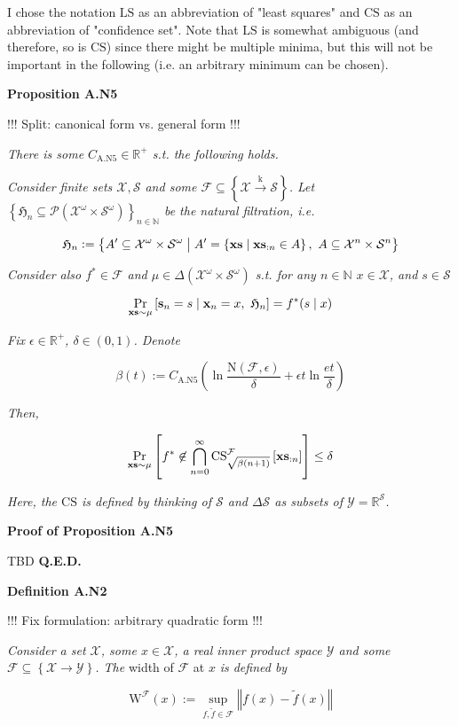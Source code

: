 \documentclass[a4paper]{article}
\newcommand{\Co}[1]{}
\newcommand{\AP}[1]{\left(#1\right)}
\newcommand{\AB}[1]{\left[#1\right]}
\newcommand{\AC}[1]{\left\{#1\right\}}
\newcommand{\ABM}[2]{\left[#1\;\middle\vert\;#2\right]}
\newcommand{\ACM}[2]{\left\{#1\;\middle\vert\;#2\right\}}
\newcommand{\Pa}[2]{\underset{#1}{\operatorname{Pr}}\AB{#2}}
\newcommand{\CP}[3]{\underset{#1}{\operatorname{Pr}}\ABM{#2}{#3}}
\newcommand{\PS}[1]{\mathcal{P}\AP{#1}}
\newcommand{\Nats}{\mathbb{N}}
\newcommand{\Reals}{\mathbb{R}}
\newcommand{\Norm}[1]{\left\Vert #1 \right\Vert}
\newcommand{\K}{\xrightarrow{\mathrm{k}}}
\newcommand{\X}{\mathcal{X}}
\newcommand{\Y}{\mathcal{Y}}
\newcommand{\F}{\mathcal{F}}
\newcommand{\St}{\mathcal{S}}
\newcommand{\N}{\mathrm{N}}
\newcommand{\LS}{\mathrm{LS}}
\newcommand{\CS}{\mathrm{CS}}
\newcommand{\W}{\mathrm{W}}
\begin{document}
I chose the notation $\LS$ as an abbreviation of "least squares" and $\CS$ as an abbreviation of "confidence set". Note that $\LS$ is somewhat ambiguous (and therefore, so is $\CS$) since there might be multiple minima, but this will not be important in the following (i.e. an arbitrary minimum can be chosen).

\textbf{Proposition A.N5}\Co{b}

!!! Split: canonical form vs. general form !!!

\textit{There is some $C_{\mathrm{A.N5}}\in\Reals^+$ s.t. the following holds.}\Co{i}

\textit{Consider finite sets $\X,\St$ and some $\F\subseteq\AC{\X\K\St}$. Let $\AC{\mathfrak{H}_n\subseteq\PS{\X^\omega\times\St^\omega}}_{n\in\Nats}$ be the natural filtration, i.e.}\Co{i}

$$\mathfrak{H}_n:=\ACM{A'\subseteq\X^\omega\times\St^\omega}{A'=\ACM{\bold{xs}}{\bold{xs}_{:n}\in A},\ A\subseteq\X^n\times\St^n}$$

\textit{Consider also $f^*\in\F$ and $\mu\in\Delta\AP{\X^\omega\times\St^\omega}$ s.t. for any $n\in\Nats$ $x\in\X$, and $s\in\St$}\Co{i}

$$\CP{\bold{xs}\sim\mu}{\bold{s}_n=s}{\bold{x}_n=x,\ \mathfrak{H}_n} = f^*(s\mid x)$$

\textit{Fix $\epsilon\in\Reals^+$, $\delta\in(0,1)$. Denote}\Co{i}

$$\beta(t):=C_{\mathrm{A.N5}}\AP{\ln{\frac{\N(\F,\epsilon)}{\delta}}+\epsilon t\ln{\frac{et}{\delta}}}$$

\textit{Then,}\Co{i}

$$\Pa{\bold{xs}\sim\mu}{f^*\not\in\bigcap_{n=0}^\infty\CS^\F_{\sqrt{\beta(n+1)}}\AB{\bold{xs}_{:n}}} \leq \delta$$

\textit{Here, the $\CS$ is defined by thinking of $\St$ and $\Delta\St$ as subsets of $\Y=\Reals^\St$.}\Co{i}

\textbf{Proof of Proposition A.N5}\Co{b}

TBD \textbf{Q.E.D.}\Co{b}

\textbf{Definition A.N2}\Co{b}

!!! Fix formulation: arbitrary quadratic form !!!

\textit{Consider a set $\X$, some $x\in\X$, a real inner product space $\Y$ and some $\F\subseteq\AC{\X\rightarrow\Y}$. The}\Co{i} width of $\F$ at $x$ \textit{is defined by}\Co{i}

$$\W^\F(x):=\sup_{f,\tilde{f}\in\F}\Norm{f(x)-\tilde{f}(x)}$$  
\end{document}
